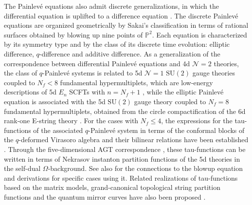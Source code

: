 \documentclass[11pt, a4paper]{article}
\theoremstyle{definition}
\begin{document}
The Painlev\'e equations also admit discrete generalizations, in which the differential equation is uplifted to a difference equation \cite{Grammaticos:1991zz, Ramani:1991zz, Jimbo:1995}. The discrete Painlev\'e equations are organized geometrically by Sakai's classification \cite{Sakai:2001,Yamada:2020hqd,Mizoguchi:2002kg} in terms of rational surfaces obtained by blowing up nine points of $ \mathbb{P}^2 $. Each equation is characterized by its symmetry type and by the class of its discrete time evolution: elliptic difference, $ q $-difference and additive difference. As a generalization of the correspondence between differential Painlev\'e equations and 4d $ \mathcal{N}=2 $ theories, the class of $ q $-Painlev\'e systems is related to 5d $\mathcal N=1$ $\mathrm{SU}(2)$ gauge theories coupled to $ N_f<8 $ fundamental hypermultiplets, which are low-energy descriptions of 5d $ E_n $ SCFTs with $ n=N_f+1 $ \cite{Seiberg:1996bd, Morrison:1996xf}, while the elliptic Painlev\'e equation is associated with the 5d $ \mathrm{SU}(2) $ gauge theory coupled to $ N_f=8 $ fundamental hypermultiplets, obtained from the circle compactification of the 6d rank-one E-string theory \cite{Mizoguchi:2002kg}. For the cases with $ N_f \leq 4 $, the expressions for the tau-functions of the associated $ q $-Painlev\'e system in terms of the conformal blocks of the $ q $-deformed Virasoro algebra and their bilinear relations have been established \cite{Bershtein:2016aef,Jimbo:2017ael,Matsuhira:2018qtx}. Through the five-dimensional AGT correspondence \cite{Awata:2009ur}, these tau-functions can be written in terms of Nekrasov instanton partition functions of the 5d theories in the self-dual $ \Omega $-background. See also \cite{Bershtein:2014yia, Bershtein:2018zcz, Shchechkin:2020ryb, Gavrylenko:2020gjb,Jeong:2020uxz, Nekrasov:2020qcq, Stoyan:2025qya} for the connections to the blowup equation \cite{Nakajima:2003pg, Nakajima:2005fg, Gottsche:2006bm} and derivations for specific cases using it. Related realizations of tau-functions based on the matrix models, grand-canonical topological string partition functions and the quantum mirror curves have also been proposed \cite{Mironov:2017sqp, Bonelli:2017gdk, Nosaka:2020tyv,Bonelli:2022dse,Mironov:2022xew,Gavrylenko:2023ewx,Moriyama:2023mjx}.
\end{document}
